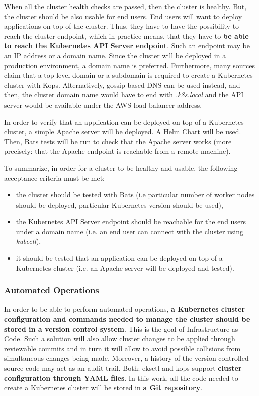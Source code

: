 When all the cluster health checks are passed, then the cluster is healthy. But, the cluster should be also usable for end users. End users will want to deploy applications on top of the cluster. Thus, they have to have the possibility to reach the cluster endpoint, which in practice means, that they have to \textbf{be able to reach the Kubernetes API Server endpoint}. Such an endpoint may be an IP address or a domain name. Since the cluster will be deployed in a production environment, a domain name is preferred. Furthermore, many sources claim that a top-level domain or a subdomain is required to create a Kubernetes cluster with Kops. Alternatively, gossip-based DNS can be used instead, and then, the cluster domain name would have to end with \textit{.k8s.local} and the API server would be available under the AWS load balancer address\cite{kops-howto-aws}\cite{online-kops-aws}\cite{kops-howto-k8s}\cite{kops-gossip}.

In order to verify that an application can be deployed on top of a Kubernetes cluster, a simple Apache server will be deployed. A Helm Chart will be used\cite{helm-apache}. Then, Bats tests will be run to check that the Apache server works (more precisely: that the Apache endpoint is reachable from a remote machine).

To summarize, in order for a cluster to be healthy and usable, the following acceptance criteria must be met:
\begin{itemize}
\item the cluster should be tested with Bats (i.e particular number of worker nodes should be deployed, particular Kubernetes version should be used),
\item the Kubernetes API Server endpoint should be reachable for the end users under a domain name (i.e. an end user can connect with the cluster using \textit{kubectl}),
\item it should be tested that an application can be deployed on top of a Kubernetes cluster (i.e. an Apache server will be deployed and tested).
\end{itemize}

\subsubsection{Automated Operations}

In order to be able to perform automated operations, \textbf{a Kubernetes cluster configuration and commands needed to manage the cluster should be stored in a version control system}. This is the goal of Infrastructure as Code. Such a solution will also allow cluster changes to be applied through reviewable commits and in turn it will allow to avoid possible collisions from simultaneous changes being made. Moreover, a history of the version controlled source code may act as an audit trail\cite{online-kops-ci}\cite{online-kops-manifest}. Both: eksctl and kops support \textbf{cluster configuration through YAML files}. In this work, all the code needed to create a Kubernetes cluster will be stored in \textbf{a Git repository}.

